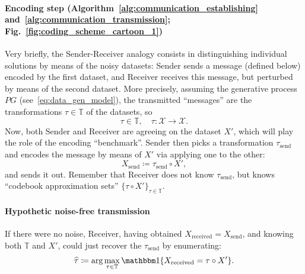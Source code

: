 \paragraph{Encoding step (Algorithm~\ref{alg:communication_establishing}
and~\ref{alg:communication_transmission};
Fig.~\ref{fig:coding_scheme_cartoon_1})} Very briefly, the Sender-Receiver
analogy consists in distinguishing individual solutions by means of the noisy
datasets: Sender sends a message (defined below) encoded by the first dataset,
and Receiver receives this message, but perturbed by means of the second
dataset. More precisely, assuming the generative process $PG$
(see~\eqref{eq:data_gen_model}), the transmitted ``messages'' are the
transformations $\tau \in \mathbb{T}$ of the datasets, so
\begin{equation}
  \tau \in \mathbb{T}, \quad \tau \colon \mathcal{X} \to \mathcal{X}.
\end{equation}
%
%
Now, both Sender and Receiver are agreeing on the dataset $X'$, which will
play the role of the encoding ``benchmark''. Sender then picks a
transformation $\tau_{\text{send}}$ and encodes the message by means of $X'$ via
applying one to the other:
\begin{equation}
  X_{\text{send}} \coloneqq \tau_{\text{send}} \circ X',
\end{equation}
%
%
and sends it out. Remember that Receiver does not know $\tau_{\text{send}}$, but knows
``codebook approximation sets'' $\{\tau \circ X'\}_{\tau \in \mathbb{T}}$.

\paragraph{Hypothetic noise-free transmission}
If there were no noise, Receiver, having obtained $X_\text{received} =
X_{\text{send}}$, and knowing both $\mathbb{T}$ and $X'$, could just recover the
$\tau_{\text{send}}$ by enumerating:
\begin{equation}
\label{eq:acs_brute_force_decoding}
  \hat \tau \coloneqq \arg \max_{\tau \in \mathbb{T}} \Ind\{X_{\text{received}} = 
    \tau \circ X' \}.
\end{equation}
%


